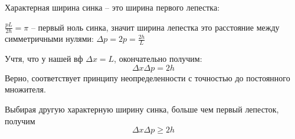 Характерная ширина синка -- это ширина первого лепестка:

$\frac{pL}{2\hbar}=\pi$ -- первый ноль синка, значит ширина лепестка это расстояние между симметричными нулями: $\Delta p = 2p=\frac{2h}{L}$

Учтя, что у нашей вф $\Delta x = L$, окончательно получим:
$$
\Delta x \Delta p = 2h
$$
Верно, соответствует принципу неопределенности с точностью до постоянного множителя.

Выбирая другую характерную ширину синка, больше чем первый лепесток, получим 
$$
\Delta x \Delta p \geq 2h
$$